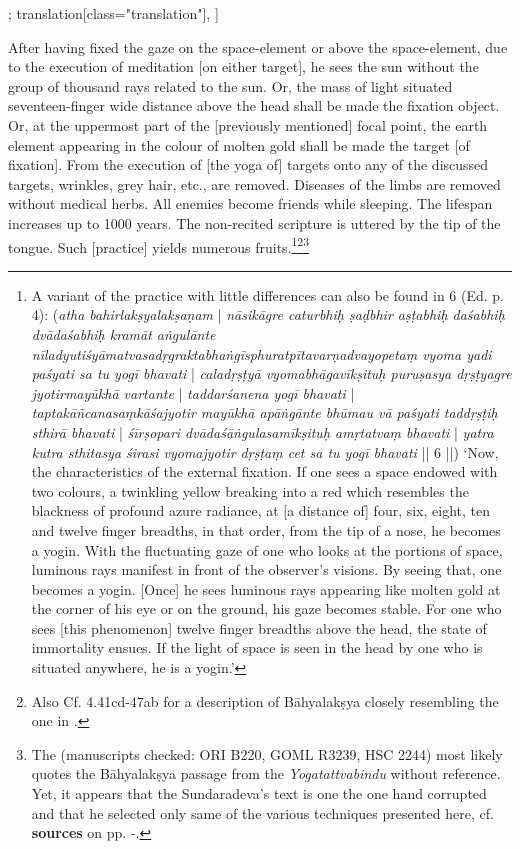 \begin{alignment}[
  texts=edition[class="edition"];
  translation[class="translation"],
  ]
\begin{translation}
\begin{tlate}[p23_02]
After having fixed the gaze on the space-element or above the space-element, due to the execution of meditation [on either target], he sees the sun without the group of thousand rays related to the sun. Or, the mass of light situated seventeen-finger wide distance above the head shall be made the fixation object. Or, at the uppermost part of the [previously mentioned] focal point, the earth element appearing in the colour of molten gold shall be made the target [of fixation]. From the execution of [the yoga of] targets onto any of the discussed targets, wrinkles, grey hair, etc., are removed. Diseases of the limbs are removed without medical herbs. All enemies become friends while sleeping. The lifespan increases up to 1000 years. The non-recited scripture is uttered by the tip of the tongue. Such [practice] yields numerous fruits.\footnote{A variant of the practice with little differences can also be found in  6 (Ed. p. 4): (\textit{atha bahirlakṣyalakṣaṇam} | \textit{nāsikāgre caturbhiḥ ṣaḍbhir aṣṭabhiḥ daśabhiḥ dvādaśabhiḥ kramāt aṅgulānte nīladyutiśyāmatvasadṛgraktabhaṅgīsphuratpītavarṇadvayopetaṃ vyoma yadi paśyati sa tu yogī bhavati} | \textit{caladṛṣṭyā vyomabhāgavīkṣituḥ puruṣasya dṛṣṭyagre jyotirmayūkhā vartante} | \textit{taddarśanena yogī bhavati} | \textit{taptakāñcanasaṃkāśajyotir mayūkhā apāṅgānte bhūmau vā paśyati taddṛṣṭiḥ sthirā bhavati} | \textit{śīrṣopari dvādaśāṅgulasamīkṣituḥ amṛtatvaṃ bhavati} | \textit{yatra kutra sthitasya śirasi vyomajyotir dṛṣṭaṃ cet sa tu yogī bhavati} || 6 ||) `Now, the characteristics of the external fixation. If one sees a space endowed with two colours, a twinkling yellow breaking into a red which resembles the blackness of profound azure radiance, at [a distance of] four, six, eight, ten and twelve finger breadths, in that order, from the tip of a nose, he becomes a yogin. With the fluctuating gaze of one who looks at the portions of space, luminous rays manifest in front of the observer's visions. By seeing that, one becomes a yogin. [Once] he sees luminous rays appearing like molten gold at the corner of his eye or on the ground, his gaze becomes stable. For one who sees [this phenomenon] twelve finger breadths above the head, the state of immortality ensues. If the light of space is seen in the head by one who is situated anywhere, he is a yogin.'}\footnote{Also Cf.  4.41cd-47ab for a description of Bāhyalakṣya closely resembling the one in .}\footnote{The  (manuscripts checked: ORI B220, GOML R3239, HSC 2244) most likely quotes the Bāhyalakṣya passage from the \textit{Yogatattvabindu} without reference. Yet, it appears that the Sundaradeva's text is one the one hand corrupted and that he selected only same of the various techniques presented here, cf. \textbf{sources} on pp. \pageref{bahya}-\pageref{continuebahya}.}
\end{tlate}
  \end{translation}
\end{alignment}
\pagebreak %
